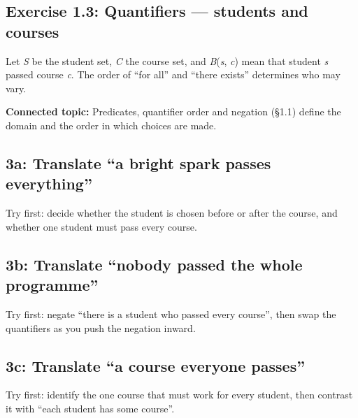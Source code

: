 \documentclass[11pt]{article}
\begin{document}
\begin{keepsection}
\section{Exercise 1.3: Quantifiers — students and courses}

Let \textit{S} be the student set, \textit{C} the course set, and \textit{B}(\textit{s}, \textit{c}) mean that student \textit{s} passed course \textit{c}. The order of “for all” and “there exists” determines who may vary.

\textbf{Connected topic:} Predicates, quantifier order and negation (§1.1) define the domain and the order in which choices are made.

\begin{keepsection}
\subsection{3a: Translate “a bright spark passes everything”}

Try first: decide whether the student is chosen before or after the course, and whether one student must pass every course.

\end{keepsection}

\begin{keepsection}
\subsection{3b: Translate “nobody passed the whole programme”}

Try first: negate “there is a student who passed every course”, then swap the quantifiers as you push the negation inward.

\end{keepsection}

\begin{keepsection}
\subsection{3c: Translate “a course everyone passes”}

Try first: identify the one course that must work for every student, then contrast it with “each student has some course”.

\end{keepsection}
\end{keepsection}
\end{document}

